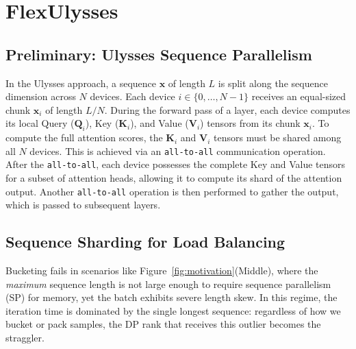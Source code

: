 \section{FlexUlysses}\label{sec:system_design}


\subsection{Preliminary: Ulysses Sequence Parallelism}

In the Ulysses approach, a sequence $\mathbf{x}$ of length $L$ is split along the sequence dimension across $N$ devices. Each device $i \in \{0, \dots, N-1\}$ receives an equal-sized chunk $\mathbf{x}_i$ of length $L/N$. During the forward pass of a layer, each device computes its local Query ($\mathbf{Q}_i$), Key ($\mathbf{K}_i$), and Value ($\mathbf{V}_i$) tensors from its chunk $\mathbf{x}_i$. To compute the full attention scores, the $\mathbf{K}_i$ and $\mathbf{V}_i$ tensors must be shared among all $N$ devices. This is achieved via an \texttt{all-to-all} communication operation. After the \texttt{all-to-all}, each device possesses the complete Key and Value tensors for a subset of attention heads, allowing it to compute its shard of the attention output. Another \texttt{all-to-all} operation is then performed to gather the output, which is passed to subsequent layers.

\subsection{Sequence Sharding for Load Balancing}


Bucketing fails in scenarios like Figure~\ref{fig:motivation}(Middle), where the \emph{maximum} sequence length is not large enough to require sequence parallelism (SP) for memory, yet the batch exhibits severe length skew. In this regime, the iteration time is dominated by the single longest sequence: regardless of how we bucket or pack samples, the DP rank that receives this outlier becomes the straggler.

